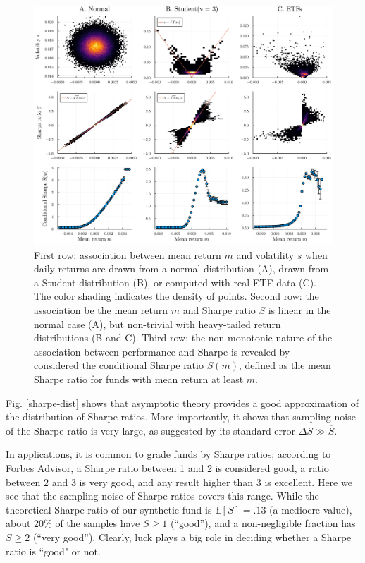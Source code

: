 \documentclass[
reprint,
amsmath,amssymb,
aps,
]{revtex4-2}
\begin{document}
\begin{figure}
    \includegraphics[width = \textwidth]{main-plot.png}
    \caption{First row: association between mean return $m$ and volatility $s$ when daily returns are drawn from a normal distribution (A), drawn from a Student distribution (B), or computed with real ETF data (C). The color shading indicates the density of points. Second row: the association be the mean return $m$ and Sharpe ratio $S$ is linear in the normal case (A), but non-trivial with heavy-tailed return distributions (B and C). Third row: the non-monotonic nature of the association between performance and Sharpe is revealed by considered the conditional Sharpe ratio $\overline{S}(m)$, defined as the mean Sharpe ratio for funds with mean return at least $m$.}
    \label{main-plot}
\end{figure}

Fig. \ref{sharpe-dist} shows that asymptotic theory provides a good approximation of the distribution of Sharpe ratios.
More importantly, it shows that sampling noise of the Sharpe ratio is very large, as suggested by its standard error $\Delta S \gg \overline{S}$.

In applications, it is common to grade funds by Sharpe ratios; according to Forbes Advisor, a Sharpe ratio between 1 and 2 is considered good, a ratio between 2 and 3 is very good, and any result higher than 3 is excellent. 
Here we see that the sampling noise of Sharpe ratios covers this range. While the theoretical Sharpe ratio of our synthetic fund is $\mathbb{E}[S] = .13$ (a mediocre value), about $20\%$ of the samples have $S \geq 1$ (``good''), and a non-negligible fraction has $S \geq 2$ (``very good''). 
Clearly, luck plays a big role in deciding whether a Sharpe ratio is ``good" or not. 
\end{document}
